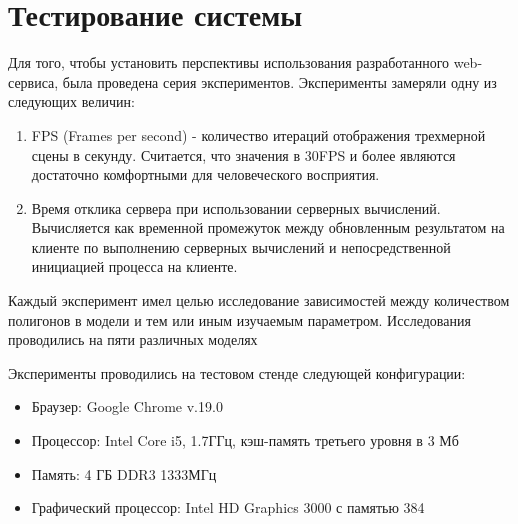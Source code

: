 \section{Тестирование системы}

Для того, чтобы установить перспективы использования разработанного web-сервиса,
была проведена серия экспериментов. Эксперименты замеряли одну из следующих
величин:
\begin{enumerate}
    \item FPS (Frames per second) - количество итераций отображения
    трехмерной сцены в секунду. Считается, что значения в 30FPS и более являются
    достаточно комфортными для человеческого восприятия.
    \item Время отклика сервера при использовании серверных
    вычислений. Вычисляется как временной промежуток между обновленным
    результатом на клиенте по выполнению серверных вычислений и непосредственной
    инициацией процесса на клиенте.
\end{enumerate}

Каждый эксперимент имел целью исследование зависимостей между количеством
полигонов в модели и тем или иным изучаемым параметром. Исследования проводились
на пяти различных моделях

\begin{table}[ht]
\begin{center}
\end{center}
\caption{Тестовое множество}
\label{table:testset}
\end{table}

Эксперименты проводились на тестовом стенде следующей конфигурации:
\begin{itemize}
    \item Браузер: Google Chrome v.19.0
    \item Процессор: Intel Core i5, 1.7ГГц, кэш-память третьего уровня в 3 Мб
    \item Память: 4 ГБ DDR3 1333МГц
    \item Графический процессор: Intel HD Graphics 3000 с памятью 384
\end{itemize}

